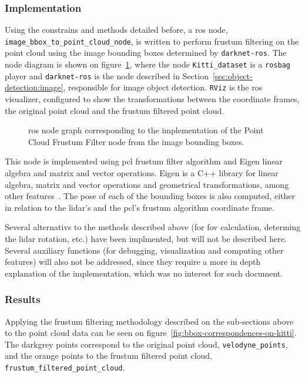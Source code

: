 \subsubsection{Implementation}
Using the constrains and methods detailed before, a \ac{ros} node, \texttt{image\_bbox\_to\_point\_cloud\_node}, is written to perform frustum filtering on the point cloud using the image bounding boxes determined by \texttt{darknet-ros}. The node diagram is shown on figure~\ref{fig:ros-graph-frustum}, where the node \texttt{Kitti\_dataset} is a \texttt{rosbag} player and \texttt{darknet-ros} is the node described in Section~\ref{sec:object-detection:image}, responsible for image object detection. \texttt{RViz} is the \ac{ros} visualizer, configured to show the transformations between the coordinate frames, the original point cloud and the frustum filtered point cloud.

\begin{figure}[t]
	\centering
	\def\svgwidth{\columnwidth}
	\graphicspath{{img/image-object-to-point-cloud/}}
	
	\caption{\ac{ros} node graph corresponding to the implementation of the Point Cloud Frustum Filter node from the image bounding boxes. }
	\label{fig:ros-graph-frustum}
\end{figure}


This node is implemented using \ac{pcl} frustum filter algorithm and Eigen linear algebra and matrix and vector operations. Eigen is a C++ library for linear algebra, matrix and vector operations and geometrical transformations, among other features~\cite{Eigenv3}. The pose of each of the bounding boxes is also computed, either in relation to the \ac{lidar}'s and the \ac{pcl}'s frustum algorithm coordinate frame. 

Several alternativs to the methods described above (for \ac{fov} calculation, determing the \ac{lidar} rotation, etc.) have been implmented, but will not be described here. Several auxiliary functions (for debugging, visualization and computing other features) will also not be addressed, since they require a more in depth explanation of the implementation, which was no interest for such document. 


\subsubsection{Results}
Applying the frustum filtering methodology described on the sub-sections above to the point cloud data can be seen on figure~\ref{fig:bbox-correspondences-on-kitti}. The darkgrey points correspond to the original point cloud, \texttt{velodyne\_points}, and the orange points to the frustum filtered point cloud, \texttt{frustum\_filtered\_point\_cloud}.

